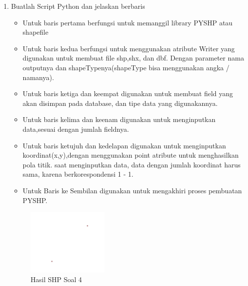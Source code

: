 \begin{enumerate}
	\item Buatlah Script Python dan jelaskan berbaris
	
	\begin{itemize}
		\item Untuk baris pertama berfungsi untuk memanggil library PYSHP atau shapefile
		\item Untuk baris kedua berfungsi untuk menggunakan atribute Writer yang digunakan untuk membuat file shp,shx, dan dbf. \hfill\break Dengan parameter nama outputnya dan shapeTypenya(shapeType bisa menggunakan angka / namanya).
		\item Untuk baris ketiga dan keempat digunakan untuk membuat field yang akan disimpan pada database, dan tipe data yang digunakannya.
		\item Untuk baris kelima dan keenam digunakan untuk menginputkan data,sesuai dengan jumlah fieldnya.
		\item Untuk baris ketujuh dan kedelapan digunakan untuk menginputkan koordinat(x,y),dengan menggunakan point atribute untuk menghasilkan pola titik. \hfill\break
		saat menginputkan data, data dengan jumlah koordinat harus sama, karena berkorespondensi 1 - 1.
		\item Untuk Baris ke Sembilan digunakan untuk mengakhiri proses pembuatan PYSHP.
	\end{itemize}
	\hfill\break
	\begin{figure}[H]
		\includegraphics[width=4cm]{figures/1174027/2/soal4.png}
		\centering
		\caption{Hasil SHP Soal 4}
	\end{figure}


\end{enumerate}
